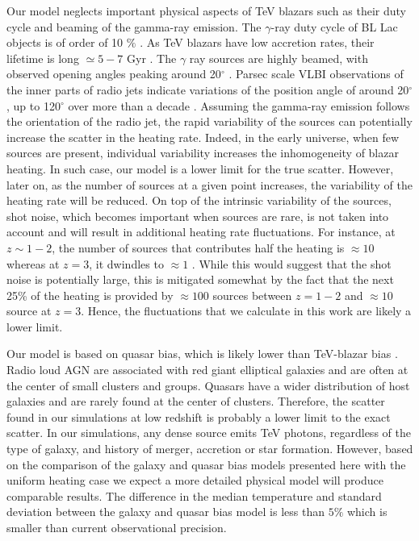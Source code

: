 \documentclass[numberedappendix]{emulateapj}
\newcommand\ALc[1]{{\color{red} \bf #1}} %
\begin{document}
Our model neglects important physical aspects of TeV blazars such as their duty cycle and beaming of the gamma-ray emission. The $\gamma$-ray duty cycle of BL Lac objects is of order of 10 $\%$ \citep{1996ApJ...464..600S}. As TeV blazars have low accretion rates, their lifetime is long $\simeq 5-7$ Gyr \citep{2002ApJ...571..226C}. The $\gamma$ ray sources are highly beamed, with observed opening angles peaking around 20$^{\circ}$ \citep{2009A&A...507L..33P}. Parsec scale VLBI observations of the inner parts of radio jets indicate variations of the position angle of around 20$^{\circ}$, up to 120$^{\circ}$ over more than a decade \citep{2013AJ....146..120L}. Assuming the gamma-ray emission follows the orientation of the radio jet, the rapid variability of the sources can potentially increase the scatter in the heating rate. Indeed, in the early universe, when few sources are present,  individual variability increases the inhomogeneity of blazar heating. In such case, our model is a lower limit for the true scatter. However, later on, as the number of sources at a  given point increases, the variability of the heating rate will be reduced.    On top of the intrinsic  variability  of the sources, shot noise, which becomes important when sources are rare, is not taken into account and will result in additional heating rate fluctuations. For instance, at $z \sim 1-2$, the number of sources that contributes half the heating is $\approx 10$ whereas at $z = 3$, it dwindles to $\approx 1$ \citep{2012ApJ...752...23C}.   While this would suggest that the shot noise is potentially large, this is mitigated somewhat by the fact that the next 25\% of the heating is provided by $\approx 100$ sources between $z=1-2$ and $\approx 10$ source at $z=3$. 
Hence, the fluctuations that we calculate in this work are likely a lower limit.

Our model is based on quasar bias, which is likely lower than TeV-blazar bias \citep{2014arXiv1410.0358A}. Radio loud AGN are associated with red giant elliptical galaxies \citep{2007A&A...476..723H} and are often at the center of small clusters and groups. Quasars have a wider distribution of host galaxies and are rarely found at the center of clusters. Therefore, the scatter found in our simulations at low redshift is probably a lower limit to the exact scatter. In our simulations, any dense source emits TeV photons, regardless of the type of galaxy, and history of merger, accretion or star formation. However, based on the comparison of the galaxy and quasar bias models presented here with the uniform heating case we expect a more detailed physical model will produce comparable results. The difference in the median temperature and standard deviation between the galaxy and quasar bias model is less than $5\%$ which is smaller than current observational precision.
\end{document}
